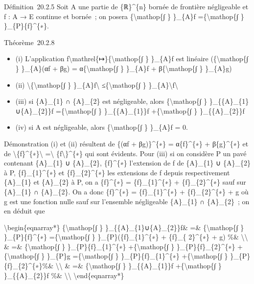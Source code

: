 \documentclass[]{article}
\begin{document}
Définition~20.2.5 Soit A une partie de \{ℝ\}\^{}\{n\} bornée de
frontière négligeable et f : A → E continue et bornée~; on posera
\{\textbackslash{}mathop\{∫ \} \}\_\{A\}f =\{\textbackslash{}mathop\{∫
\} \}\_\{P\}\{f\}\^{}\{∗\}.

Théorème~20.2.8

\begin{itemize}
\itemsep1pt\parskip0pt
\item
  (i) L'application
  f\textbackslash{}mathrel\{↦\}\{\textbackslash{}mathop\{∫ \} \}\_\{A\}f
  est linéaire (\{\textbackslash{}mathop\{∫ \} \}\_\{A\}(αf + βg) =
  α\{\textbackslash{}mathop\{∫ \} \}\_\{A\}f +
  β\{\textbackslash{}mathop\{∫ \} \}\_\{A\}g)
\item
  (ii) \textbackslash{}\textbar{}\{\textbackslash{}mathop\{∫ \}
  \}\_\{A\}f\textbackslash{}\textbar{} ≤\{\textbackslash{}mathop\{∫ \}
  \}\_\{A\}\textbackslash{}\textbar{}f\textbackslash{}\textbar{}
\item
  (iii) si \{A\}\_\{1\} ∩ \{A\}\_\{2\} est négligeable, alors
  \{\textbackslash{}mathop\{∫ \} \}\_\{\{A\}\_\{1\}∪\{A\}\_\{2\}\}f
  =\{\textbackslash{}mathop\{∫ \} \}\_\{\{A\}\_\{1\}\}f
  +\{\textbackslash{}mathop\{∫ \} \}\_\{\{A\}\_\{2\}\}f
\item
  (iv) si A est négligeable, alors \{\textbackslash{}mathop\{∫ \}
  \}\_\{A\}f = 0.
\end{itemize}

Démonstration (i) et (ii) résultent de \{(αf + βg)\}\^{}\{∗\} =
α\{f\}\^{}\{∗\} + β\{g\}\^{}\{∗\} et de
\textbackslash{}\textbar{}\{f\}\^{}\{∗\}\textbackslash{}\textbar{}
=\textbackslash{}\textbar{} \{f\textbackslash{}\textbar{}\}\^{}\{∗\} qui
sont évidents. Pour (iii) si on considère P un pavé contenant
\{A\}\_\{1\} ∪ \{A\}\_\{2\}, \{f\}\^{}\{∗\} l'extension de f de
\{A\}\_\{1\} ∪ \{A\}\_\{2\} à P, \{f\}\_\{1\}\^{}\{∗\} et
\{f\}\_\{2\}\^{}\{∗\} les extensions de f depuis respectivement
\{A\}\_\{1\} et \{A\}\_\{2\} à P, on a \{f\}\^{}\{∗\} =
\{f\}\_\{1\}\^{}\{∗\} + \{f\}\_\{2\}\^{}\{∗\} sauf sur \{A\}\_\{1\} ∩
\{A\}\_\{2\}. On a donc \{f\}\^{}\{∗\} = \{f\}\_\{1\}\^{}\{∗\} +
\{f\}\_\{2\}\^{}\{∗\} + g où g est une fonction nulle sauf sur
l'ensemble négligeable \{A\}\_\{1\} ∩ \{A\}\_\{2\}~; on en déduit que

\textbackslash{}begin\{eqnarray*\} \{\textbackslash{}mathop\{∫ \}
\}\_\{\{A\}\_\{1\}∪\{A\}\_\{2\}\}f\& =\& \{\textbackslash{}mathop\{∫ \}
\}\_\{P\}\{f\}\^{}\{∗\} =\{\textbackslash{}mathop\{∫ \}
\}\_\{P\}(\{f\}\_\{1\}\^{}\{∗\} + \{f\}\_\{ 2\}\^{}\{∗\} + g) \%\&
\textbackslash{}\textbackslash{} \& =\& \{\textbackslash{}mathop\{∫ \}
\}\_\{P\}\{f\}\_\{1\}\^{}\{∗\} +\{\textbackslash{}mathop\{∫ \}
\}\_\{P\}\{f\}\_\{2\}\^{}\{∗\} +\{\textbackslash{}mathop\{∫ \}
\}\_\{P\}g =\{\textbackslash{}mathop\{∫ \}
\}\_\{P\}\{f\}\_\{1\}\^{}\{∗\} +\{\textbackslash{}mathop\{∫ \}
\}\_\{P\}\{f\}\_\{2\}\^{}\{∗\}\%\& \textbackslash{}\textbackslash{} \&
=\& \{\textbackslash{}mathop\{∫ \} \}\_\{\{A\}\_\{1\}\}f
+\{\textbackslash{}mathop\{∫ \} \}\_\{\{A\}\_\{2\}\}f \%\&
\textbackslash{}\textbackslash{} \textbackslash{}end\{eqnarray*\}
\end{document}
